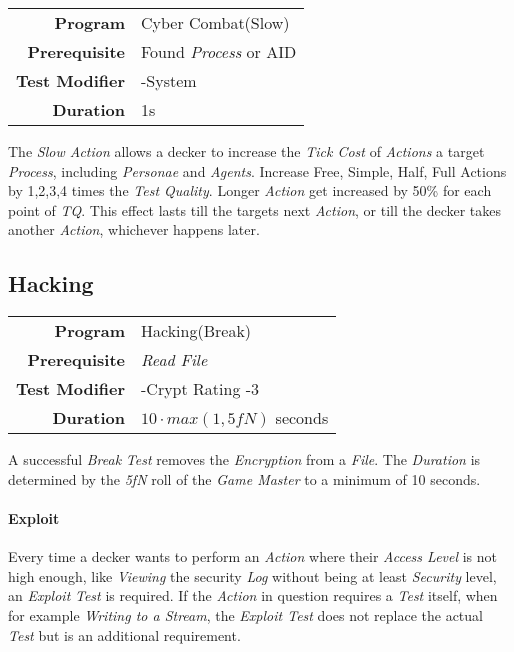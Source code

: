 \begin{tabular}{rl}
    \textbf{Program}       & Cyber Combat(Slow)          \\
    \textbf{Prerequisite}  & Found \emph{Process} or AID \\
    \textbf{Test Modifier} & -System                     \\
    \textbf{Duration}      & 1s                          \\
\end{tabular}

\hfill

The \emph{Slow Action} allows a decker to increase the \emph{Tick Cost} of
\emph{Actions} a target \emph{Process}, including \emph{Personae} and \emph{Agents}.
Increase Free, Simple, Half, Full Actions by 1,2,3,4 times the \emph{Test Quality}.
Longer \emph{Action} get increased by 50\% for each point of \emph{TQ}.
This effect lasts till the targets next \emph{Action}, or till the decker takes
another \emph{Action}, whichever happens later.

\subsection{Hacking}

\label{par:break}

\begin{tabular}{rl}
    \textbf{Program}       & Hacking(Break)                                   \\
    \textbf{Prerequisite}  & \emph{Read File}                                 \\
    \textbf{Test Modifier} & -Crypt Rating -3                                 \\
    \textbf{Duration}      & $10 \cdot \textit{max}(1, \textit{5fN})$ seconds \\
\end{tabular}

\hfill

A successful \emph{Break} \emph{Test} removes the \emph{Encryption} from a
\emph{File}. The \emph{Duration} is determined by the \emph{5fN} roll of the
\emph{Game Master} to a minimum of 10 seconds.

\paragraph{Exploit}

Every time a decker wants to perform an \emph{Action} where their \emph{Access Level}
is not high enough, like \emph{Viewing} the security \emph{Log} without being
at least \emph{Security} level, an \emph{Exploit} \emph{Test} is required.
If the \emph{Action} in question requires a \emph{Test} itself,
when for example \emph{Writing to a Stream}, the \emph{Exploit Test} does not
replace the actual \emph{Test} but is an additional requirement.

